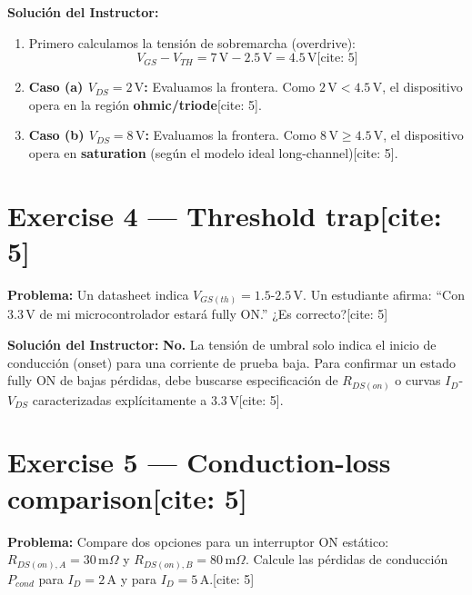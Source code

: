 \documentclass[11pt, a4paper]{article}
\begin{document}
\vspace{0.2cm}
\textbf{Solución del Instructor:}
\begin{enumerate}
    \item Primero calculamos la tensión de sobremarcha (overdrive):
    \begin{equation*}
        V_{GS} - V_{TH} = 7\,\text{V} - 2.5\,\text{V} = 4.5\,\text{V} \text{[cite: 5]}
    \end{equation*}
    \item \textbf{Caso (a) $V_{DS} = 2\,\text{V}$:} Evaluamos la frontera. Como $2\,\text{V} < 4.5\,\text{V}$, el dispositivo opera en la región \textbf{ohmic/triode}[cite: 5].
    \item \textbf{Caso (b) $V_{DS} = 8\,\text{V}$:} Evaluamos la frontera. Como $8\,\text{V} \ge 4.5\,\text{V}$, el dispositivo opera en \textbf{saturation} (según el modelo ideal long-channel)[cite: 5].
\end{enumerate}

\section*{Exercise 4 — Threshold trap[cite: 5]}
\textbf{Problema:} Un datasheet indica $V_{GS(th)} = 1.5\text{-}2.5\,\text{V}$. Un estudiante afirma: ``Con $3.3\,\text{V}$ de mi microcontrolador estará fully ON.'' ¿Es correcto?[cite: 5]

\vspace{0.2cm}
\textbf{Solución del Instructor:}
\textbf{No.} La tensión de umbral solo indica el inicio de conducción (onset) para una corriente de prueba baja. Para confirmar un estado fully ON de bajas pérdidas, debe buscarse especificación de $R_{DS(on)}$ o curvas $I_D$-$V_{DS}$ caracterizadas explícitamente a $3.3\,\text{V}$[cite: 5].

\section*{Exercise 5 — Conduction-loss comparison[cite: 5]}
\textbf{Problema:} Compare dos opciones para un interruptor ON estático: $R_{DS(on),A} = 30\,\text{m}\Omega$ y $R_{DS(on),B} = 80\,\text{m}\Omega$. Calcule las pérdidas de conducción $P_{cond}$ para $I_D = 2\,\text{A}$ y para $I_D = 5\,\text{A}$.[cite: 5]
\end{document}
